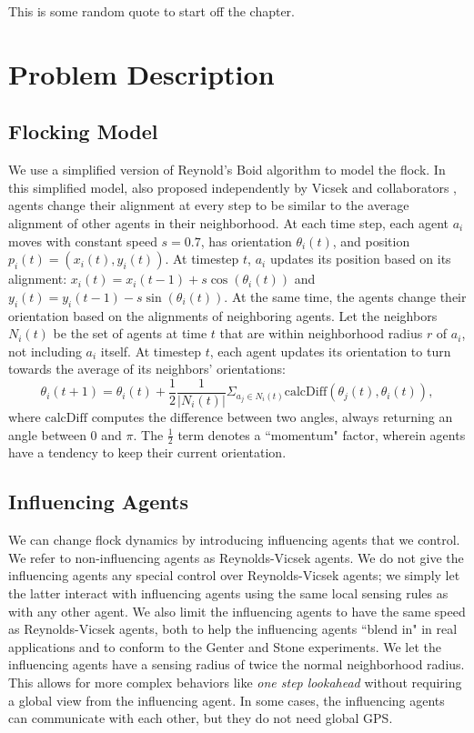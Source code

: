 \begin{savequote}[75mm]
This is some random quote to start off the chapter.
\end{savequote}

\chapter{Problem Description}
\label{ch:problem}

\section{Flocking Model}
We use a simplified version of Reynold's Boid algorithm \cite{reynoldsmodel}
to model the flock.
In this simplified model, also proposed independently by Vicsek and
collaborators \cite{vicsek1995},
agents change their alignment at every step to be similar to the average
alignment of other agents in their neighborhood.
At each time step, each agent $a_i$ moves with constant speed $s=0.7$, has
orientation $\theta_i(t)$, and position $p_i(t) = (x_i(t), y_i(t))$.
At timestep $t$, $a_i$ updates its position based on its alignment:
$x_i(t) = x_i(t-1) + s\cos(\theta_i(t))$ and
$y_i(t) = y_i (t-1) - s\sin(\theta_i(t))$.
At the same time, the agents change their orientation based on the alignments
of neighboring agents.
Let the neighbors $N_i(t)$ be the set of agents at time $t$ that are within
neighborhood radius $r$ of $a_i$, not including $a_i$ itself.
At timestep $t$, each agent updates its orientation to turn towards the average
of its neighbors' orientations:
\[\theta_i(t+1)=\theta_i(t)+\frac{1}{2}\frac{1}{|N_i(t)|} \Sigma_{a_j \in
N_i(t)} \text{calcDiff}(\theta_j(t),\theta_i(t)),\]
where $\text{calcDiff}$ computes the difference between two angles, always
returning an angle between $0$ and $\pi$.
The $\frac{1}{2}$ term denotes a ``momentum" factor, wherein agents have
a tendency to keep their current orientation.

\section{Influencing Agents}
We can change flock dynamics by introducing influencing agents that we control.
We refer to non-influencing agents as Reynolds-Vicsek agents.
We do not give the influencing agents any special control over Reynolds-Vicsek
agents; we simply let the latter interact with influencing agents using the
same local sensing rules as with any other agent.
We also limit the influencing agents to have the same speed as Reynolds-Vicsek
agents, both to help the influencing agents ``blend in" in real applications
and to conform to the Genter and Stone experiments.
We let the influencing agents have a sensing radius of twice the normal
neighborhood radius.
This allows for more complex behaviors like \textit{one step lookahead}
without requiring a global view from the influencing agent.
In some cases, the influencing agents can communicate with each other, but
they do not need global GPS.

